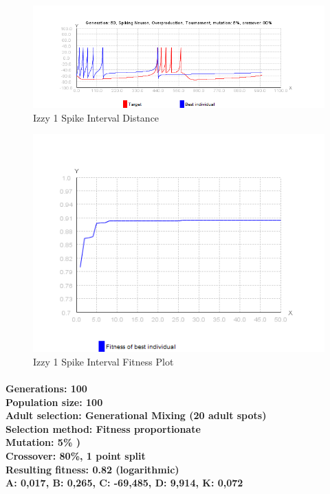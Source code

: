 \documentclass[titlepage,norsk]{article}
\begin{document}
\begin{figure}[h!]
\centering
\includegraphics[scale=0.75]{izzy1interval.png}
\caption{Izzy 1 Spike Interval Distance}
\label{fig:awesome_image}
\end{figure}

\begin{figure}[h!]
\centering
\includegraphics[scale=0.75]{izzy1intervalFitness.png}
\caption{Izzy 1 Spike Interval Fitness Plot}
\label{fig:awesome_image}
\end{figure}

\paragraph{
Generations: 100\\
Population size: 100\\
Adult selection: Generational Mixing (20 adult spots) \\
Selection method: Fitness proportionate\\
Mutation:  5\% )\\
Crossover: 80\%, 1 point split \\
Resulting fitness: 0.82 (logarithmic) \\
A: 0,017, B: 0,265, C: -69,485, D: 9,914, K: 0,072 \\
}
\end{document}
